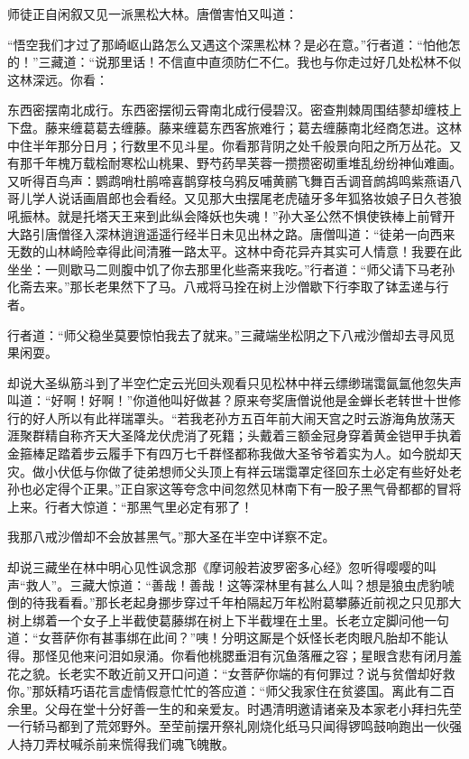 \documentclass[12pt,UTF8]{ctexbook}
\begin{document}
{	师徒正自闲叙又见一派黑松大林。唐僧害怕又叫道：
	
	“悟空我们才过了那崎岖山路怎么又遇这个深黑松林？是必在意。”行者道：“怕他怎的！”三藏道：“说那里话！不信直中直须防仁不仁。我也与你走过好几处松林不似这林深远。你看：
	
	东西密摆南北成行。东西密摆彻云霄南北成行侵碧汉。密查荆棘周围结蓼却缠枝上下盘。藤来缠葛葛去缠藤。藤来缠葛东西客旅难行；葛去缠藤南北经商怎进。这林中住半年那分日月；行数里不见斗星。你看那背阴之处千般景向阳之所万丛花。又有那千年槐万载桧耐寒松山桃果、野芍药旱芙蓉一攒攒密砌重堆乱纷纷神仙难画。又听得百鸟声：鹦鹉哨杜鹃啼喜鹊穿枝乌鸦反哺黄鹂飞舞百舌调音鹧鸪鸣紫燕语八哥儿学人说话画眉郎也会看经。又见那大虫摆尾老虎磕牙多年狐狢妆娘子日久苍狼吼振林。就是托塔天王来到此纵会降妖也失魂！”孙大圣公然不惧使铁棒上前臂开大路引唐僧径入深林逍逍遥遥行经半日未见出林之路。唐僧叫道：“徒弟一向西来无数的山林崎险幸得此间清雅一路太平。这林中奇花异卉其实可人情意！我要在此坐坐：一则歇马二则腹中饥了你去那里化些斋来我吃。”行者道：“师父请下马老孙化斋去来。”那长老果然下了马。八戒将马拴在树上沙僧歇下行李取了钵盂递与行者。
	
	行者道：“师父稳坐莫要惊怕我去了就来。”三藏端坐松阴之下八戒沙僧却去寻风觅果闲耍。
	
	却说大圣纵筋斗到了半空伫定云光回头观看只见松林中祥云缥缈瑞霭氤氲他忽失声叫道：“好啊！好啊！”你道他叫好做甚？原来夸奖唐僧说他是金蝉长老转世十世修行的好人所以有此祥瑞罩头。“若我老孙方五百年前大闹天宫之时云游海角放荡天涯聚群精自称齐天大圣降龙伏虎消了死籍；头戴着三额金冠身穿着黄金铠甲手执着金箍棒足踏着步云履手下有四万七千群怪都称我做大圣爷爷着实为人。如今脱却天灾。做小伏低与你做了徒弟想师父头顶上有祥云瑞霭罩定径回东土必定有些好处老孙也必定得个正果。”正自家这等夸念中间忽然见林南下有一股子黑气骨都都的冒将上来。行者大惊道：“那黑气里必定有邪了！
	
	我那八戒沙僧却不会放甚黑气。”那大圣在半空中详察不定。
	
	却说三藏坐在林中明心见性讽念那《摩诃般若波罗密多心经》忽听得嘤嘤的叫声“救人”。三藏大惊道：“善哉！善哉！这等深林里有甚么人叫？想是狼虫虎豹唬倒的待我看看。”那长老起身挪步穿过千年柏隔起万年松附葛攀藤近前视之只见那大树上绑着一个女子上半截使葛藤绑在树上下半截埋在土里。长老立定脚问他一句道：“女菩萨你有甚事绑在此间？”咦！分明这厮是个妖怪长老肉眼凡胎却不能认得。那怪见他来问泪如泉涌。你看他桃腮垂泪有沉鱼落雁之容；星眼含悲有闭月羞花之貌。长老实不敢近前又开口问道：“女菩萨你端的有何罪过？说与贫僧却好救你。”那妖精巧语花言虚情假意忙忙的答应道：“师父我家住在贫婆国。离此有二百余里。父母在堂十分好善一生的和亲爱友。时遇清明邀请诸亲及本家老小拜扫先茔一行轿马都到了荒郊野外。至茔前摆开祭礼刚烧化纸马只闻得锣鸣鼓响跑出一伙强人持刀弄杖喊杀前来慌得我们魂飞魄散。
	
}
\end{document}
